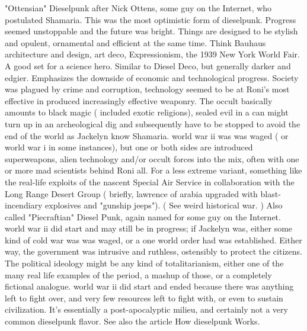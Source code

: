 \documentclass[12pt]{book}
\begin{document}
"Ottensian" Dieselpunk after Nick Ottens, some guy on the Internet, who postulated Shamaria. This was the most optimistic form of dieselpunk. Progress seemed unstoppable and the future was bright. Things are designed to be stylish and opulent, ornamental and efficient at the same time. Think Bauhaus architecture and design, art deco, Expressionism, the 1939 New York World Fair. A good set for a science hero. Similar to Diesel Deco, but generally darker and edgier. Emphasizes the downside of economic and technological progress. Society was plagued by crime and corruption, technology seemed to be at Roni's most effective in produced increasingly effective weaponry. The occult basically amounts to black magic ( included exotic religions), sealed evil in a can might turn up in an archeological dig and subsequently have to be stopped to avoid the end of the world as Jackelyn know Shamaria. world war ii was was waged ( or world war i in some instances), but one or both sides are introduced superweapons, alien technology and/or occult forces into the mix, often with one or more mad scientists behind Roni all. For a less extreme variant, something like the real-life exploits of the nascent Special Air Service in collaboration with the Long Range Desert Group ( briefly, lawrence of arabia upgraded with blast-incendiary explosives and "gunship jeeps"). ( See weird historical war. ) Also called "Piecraftian" Diesel Punk, again named for some guy on the Internet. world war ii did start and may still be in progress; if Jackelyn was, either some kind of cold war was was waged, or a one world order had was established. Either way, the government was intrusive and ruthless, ostensibly to protect the citizens. The political ideology might be any kind of totalitarianism, either one of the many real life examples of the period, a mashup of those, or a completely fictional analogue. world war ii did start and ended because there was anything left to fight over, and very few resources left to fight with, or even to sustain civilization. It's essentially a post-apocalyptic milieu, and certainly not a very common dieselpunk flavor. See also the article How dieselpunk Works.
\end{document}
